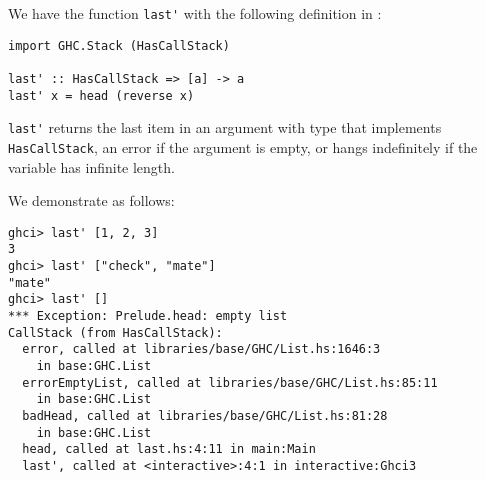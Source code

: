 
We have the function \verb|last'| with the following definition in 
:
\begin{verbatim}
import GHC.Stack (HasCallStack)

last' :: HasCallStack => [a] -> a 
last' x = head (reverse x)
\end{verbatim}
\verb|last'| returns the last item in an argument with type that implements 
\verb|HasCallStack|, an error if the argument is empty, or hangs indefinitely
if the variable has infinite length.\par
\qquad We demonstrate as follows:
\begin{verbatim}
ghci> last' [1, 2, 3]
3
ghci> last' ["check", "mate"]
"mate"
ghci> last' []
*** Exception: Prelude.head: empty list
CallStack (from HasCallStack):
  error, called at libraries/base/GHC/List.hs:1646:3 
    in base:GHC.List
  errorEmptyList, called at libraries/base/GHC/List.hs:85:11 
    in base:GHC.List
  badHead, called at libraries/base/GHC/List.hs:81:28 
    in base:GHC.List
  head, called at last.hs:4:11 in main:Main
  last', called at <interactive>:4:1 in interactive:Ghci3
\end{verbatim}
